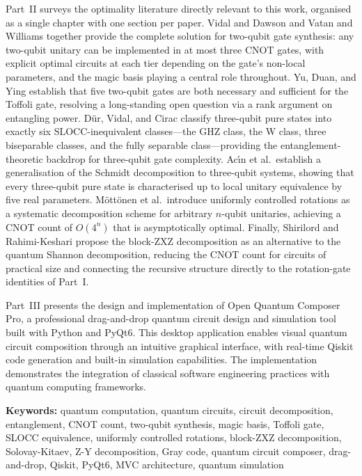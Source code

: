 \documentclass[12pt, a4paper, oneside]{report}
\theoremstyle{plain}
\theoremstyle{definition}
\theoremstyle{remark}
\begin{document}
Part~II surveys the optimality literature directly relevant to this work, organised as a single chapter with one section per paper. Vidal and Dawson and Vatan and Williams together provide the complete solution for two-qubit gate synthesis: any two-qubit unitary can be implemented in at most three CNOT gates, with explicit optimal circuits at each tier depending on the gate's non-local parameters, and the magic basis playing a central role throughout. Yu, Duan, and Ying establish that five two-qubit gates are both necessary and sufficient for the Toffoli gate, resolving a long-standing open question via a rank argument on entangling power. D\"{u}r, Vidal, and Cirac classify three-qubit pure states into exactly six SLOCC-inequivalent classes---the GHZ class, the W class, three biseparable classes, and the fully separable class---providing the entanglement-theoretic backdrop for three-qubit gate complexity. Ac\'{\i}n et al.\ establish a generalisation of the Schmidt decomposition to three-qubit systems, showing that every three-qubit pure state is characterised up to local unitary equivalence by five real parameters. M\"{o}tt\"{o}nen et al.\ introduce uniformly controlled rotations as a systematic decomposition scheme for arbitrary $n$-qubit unitaries, achieving a CNOT count of $O(4^n)$ that is asymptotically optimal. Finally, Shirilord and Rahimi-Keshari propose the block-ZXZ decomposition as an alternative to the quantum Shannon decomposition, reducing the CNOT count for circuits of practical size and connecting the recursive structure directly to the rotation-gate identities of Part~I.

Part~III presents the design and implementation of Open Quantum Composer Pro, a professional drag-and-drop quantum circuit design and simulation tool built with Python and PyQt6. This desktop application enables visual quantum circuit composition through an intuitive graphical interface, with real-time Qiskit code generation and built-in simulation capabilities. The implementation demonstrates the integration of classical software engineering practices with quantum computing frameworks.


\vspace{1em}
\noindent\textbf{Keywords:} quantum computation, quantum circuits, circuit decomposition, entanglement, CNOT count, two-qubit synthesis, magic basis, Toffoli gate, SLOCC equivalence, uniformly controlled rotations, block-ZXZ decomposition, Solovay-Kitaev, Z-Y decomposition, Gray code, quantum circuit composer, drag-and-drop, Qiskit, PyQt6, MVC architecture, quantum simulation
\end{document}
